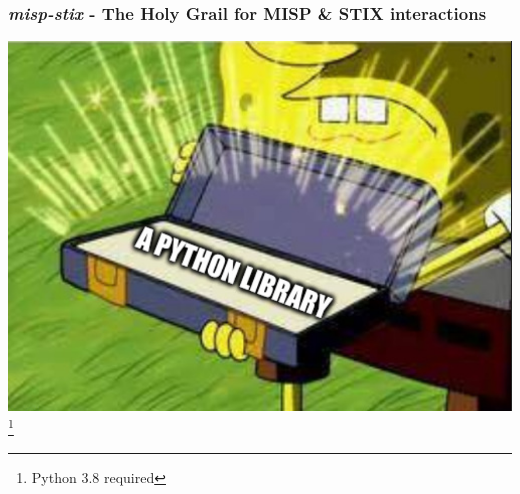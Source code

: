 \begin{frame}
    \frametitle{\emph{misp-stix} - The Holy Grail for MISP \& STIX interactions}
    \centering
    \includegraphics[scale=0.3]{images/solution.png}\footnote{Python 3.8 required}
    \setcounter{footnote}{0}
\end{frame}

